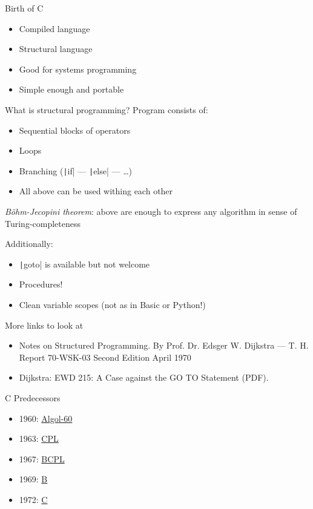 \documentclass[xetex,aspectratio=169]{beamer}
\begin{document}
\begin{frame}{Birth of C}
	\begin{itemize}
		\item Compiled language
		\item Structural language
		\item Good for systems programming
		\item Simple enough and portable
	\end{itemize}
\end{frame}

\begin{frame}{What is structural programming?}
	Program consists of:
	\begin{itemize}
		\item Sequential blocks of operators
		\item Loops
		\item Branching (\texttt|if| --- \texttt|else| --- \ldots)
		\item All above can be used withing each other
	\end{itemize}
	\pause

	\emph{B\"{o}hm-Jecopini theorem}: above are enough to express any algorithm in sense of Turing-completeness
	\pause

	Additionally:
	\begin{itemize}
		\item \texttt|goto| is available but not welcome
		\item Procedures!
		\item Clean variable scopes (not as in Basic or Python!)
	\end{itemize}
\end{frame}

\begin{frame}{More links to look at}
	\begin{itemize}
		\item Notes on Structured Programming. By Prof. Dr. Edsger W. Dijkstra — T. H. Report 70-WSK-03 Second Edition April 1970
		\item Dijkstra: EWD 215: A Case against the GO TO Statement (PDF).
	\end{itemize}
\end{frame}

\begin{frame}{C Predecessors}
	\begin{itemize}
		\item 1960: \href{https://en.wikipedia.org/wiki/ALGOL_60\#Code_sample_comparisons}{Algol-60}
		\item 1963: \href{https://en.wikipedia.org/wiki/CPL_(programming_language)\#Example}{CPL}
		\item 1967: \href{https://en.wikipedia.org/wiki/BCPL\#Examples}{BCPL}
		\item 1969: \href{https://en.wikipedia.org/wiki/B_(programming_language)\#Examples}{B}
		\item 1972: \href{https://en.wikipedia.org/wiki/C_(programming_language)\#\%22Hello,_world\%22_example}{C}
	\end{itemize}
\end{frame}
\end{document}
